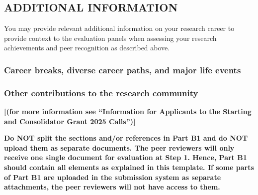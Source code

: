 \documentclass[11pt,timesnewroman,partone,draftproposal]{erc-stg}
\begin{document}
\subsection*{ADDITIONAL INFORMATION}
\label{ssc:cv:additional_information}

\begin{erccomment}
You may provide relevant additional information on your research career to
provide context to the evaluation panels when assessing your research achievements
and peer recognition as described above.
\end{erccomment}

\subsubsection*{Career breaks, diverse career paths, and major life events}

\begin{erccomment}
\end{erccomment}

\subsubsection*{Other contributions to the research community}

\begin{erccomment}

\textbf{
[(for more information see ``Information for Applicants to the Starting and
Consolidator Grant 2025 Calls'')]
}

\textbf{Do NOT split the sections and/or references in Part B1 and do NOT upload
them as separate documents. The peer reviewers will only receive one single
document for evaluation at Step 1. Hence, Part B1 should contain all elements as
explained in this template. If some parts of Part B1 are uploaded in the submission
system as separate attachments, the peer reviewers will not have access to them.}
\end{erccomment}
\end{document}
